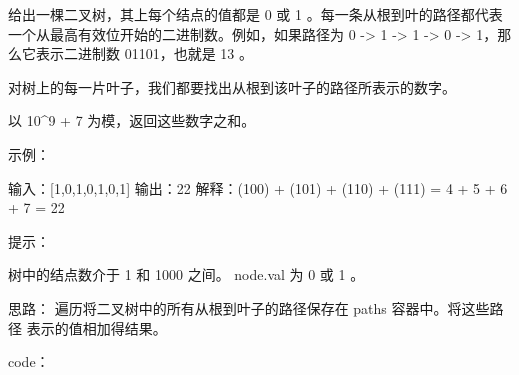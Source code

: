 给出一棵二叉树，其上每个结点的值都是 0 或 1 。每一条从根到叶的路径都代表一个从最高有效位开始的二进制数。例如，如果路径为 0 -> 1 -> 1 -> 0 -> 1，那么它表示二进制数 01101，也就是 13 。

对树上的每一片叶子，我们都要找出从根到该叶子的路径所表示的数字。

以 10^9 + 7 为模，返回这些数字之和。

 

示例：

输入：[1,0,1,0,1,0,1]
输出：22
解释：(100) + (101) + (110) + (111) = 4 + 5 + 6 + 7 = 22

 

提示：

    树中的结点数介于 1 和 1000 之间。
    node.val 为 0 或 1 。
























思路：
遍历将二叉树中的所有从根到叶子的路径保存在 paths 容器中。将这些路径 表示的值相加得结果。
























code：
